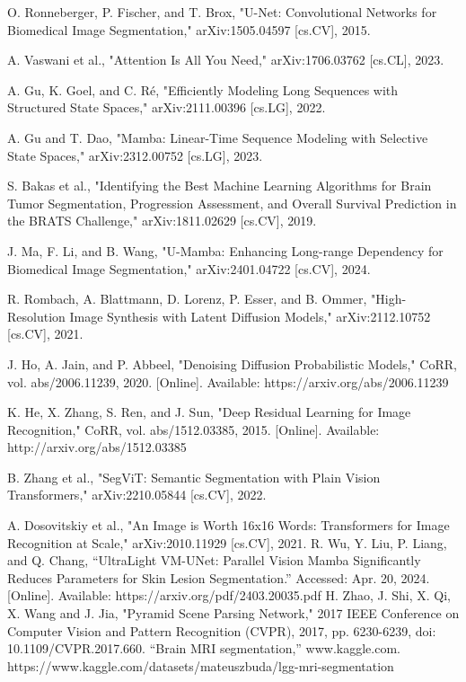 \documentclass[conference]{IEEEtran}
\begin{document}
\begin{thebibliography}{00}
 O. Ronneberger, P. Fischer, and T. Brox, "U-Net: Convolutional Networks for Biomedical Image Segmentation," arXiv:1505.04597 [cs.CV], 2015.

 A. Vaswani et al., "Attention Is All You Need," arXiv:1706.03762 [cs.CL], 2023.

 A. Gu, K. Goel, and C. Ré, "Efficiently Modeling Long Sequences with Structured State Spaces," arXiv:2111.00396 [cs.LG], 2022.

 A. Gu and T. Dao, "Mamba: Linear-Time Sequence Modeling with Selective State Spaces," arXiv:2312.00752 [cs.LG], 2023.

 S. Bakas et al., "Identifying the Best Machine Learning Algorithms for Brain Tumor Segmentation, Progression Assessment, and Overall Survival Prediction in the BRATS Challenge," arXiv:1811.02629 [cs.CV], 2019.

 J. Ma, F. Li, and B. Wang, "U-Mamba: Enhancing Long-range Dependency for Biomedical Image Segmentation," arXiv:2401.04722 [cs.CV], 2024.

 R. Rombach, A. Blattmann, D. Lorenz, P. Esser, and B. Ommer, "High-Resolution Image Synthesis with Latent Diffusion Models," arXiv:2112.10752 [cs.CV], 2021.

 J. Ho, A. Jain, and P. Abbeel, "Denoising Diffusion Probabilistic Models," CoRR, vol. abs/2006.11239, 2020. [Online]. Available: https://arxiv.org/abs/2006.11239

 K. He, X. Zhang, S. Ren, and J. Sun, "Deep Residual Learning for Image Recognition," CoRR, vol. abs/1512.03385, 2015. [Online]. Available: http://arxiv.org/abs/1512.03385

 B. Zhang et al., "SegViT: Semantic Segmentation with Plain Vision Transformers," arXiv:2210.05844 [cs.CV], 2022.

 A. Dosovitskiy et al., "An Image is Worth 16x16 Words: Transformers for Image Recognition at Scale," arXiv:2010.11929 [cs.CV], 2021.
 R. Wu, Y. Liu, P. Liang, and Q. Chang, “UltraLight VM-UNet: Parallel Vision Mamba Significantly Reduces Parameters for Skin Lesion Segmentation.” Accessed: Apr. 20, 2024. [Online]. Available: https://arxiv.org/pdf/2403.20035.pdf
H. Zhao, J. Shi, X. Qi, X. Wang and J. Jia, "Pyramid Scene Parsing Network," 2017 IEEE Conference on Computer Vision and Pattern Recognition (CVPR), 2017, pp. 6230-6239, doi: 10.1109/CVPR.2017.660.
 “Brain MRI segmentation,” www.kaggle.com. https://www.kaggle.com/datasets/mateuszbuda/lgg-mri-segmentation
\end{thebibliography}
\end{document}
